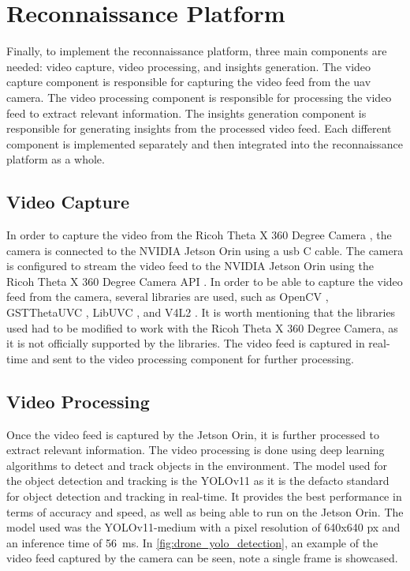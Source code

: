 \section{Reconnaissance Platform}\label{sec:implementation_reconnaissance_platform}

Finally, to implement the reconnaissance platform, three main components are needed: video capture, video processing, and insights generation. The video capture component is responsible for capturing the video feed from the \gls{uav} camera. The video processing component is responsible for processing the video feed to extract relevant information. The insights generation component is responsible for generating insights from the processed video feed. Each different component is implemented separately and then integrated into the reconnaissance platform as a whole.

\subsection{Video Capture}\label{subsec:implementation_video_capture}

In order to capture the video from the Ricoh Theta X 360 Degree Camera \autocite{ricohimagingTHETARicoh}, the camera is connected to the NVIDIA Jetson Orin \autocite{nvidiaNVIDIAJetson} using a \gls{usb} C cable. The camera is configured to stream the video feed to the NVIDIA Jetson Orin using the Ricoh Theta X 360 Degree Camera API \autocite{ricoh360ReferenceRicoh}. In order to be able to capture the video feed from the camera, several libraries are used, such as OpenCV \autocite{githubGitHubOpencvopencv}, GSTThetaUVC \autocite{githubGitHubBuburidergstthetauvc}, LibUVC \autocite{githubGitHub6GIntegration3UC3Mlibuvcthetasample}, and V4L2 \autocite{githubGitHubUmlaeutev4l2loopback}. It is worth mentioning that the libraries used had to be modified to work with the Ricoh Theta X 360 Degree Camera, as it is not officially supported by the libraries. The video feed is captured in real-time and sent to the video processing component for further processing.

\subsection{Video Processing}\label{subsec:implementation_video_processing}

Once the video feed is captured by the Jetson Orin, it is further processed to extract relevant information. The video processing is done using deep learning algorithms to detect and track objects in the environment. The model used for the object detection and tracking is the YOLOv11 \autocite{ultralyticsYOLO11} as it is the defacto standard for object detection and tracking in real-time. It provides the best performance in terms of accuracy and speed, as well as being able to run on the Jetson Orin. The model used was the YOLOv11-medium with a pixel resolution of 640x640 px and an inference time of \SI{56}{\milli\second}. In \cref{fig:drone_yolo_detection}, an example of the video feed captured by the camera can be seen, note a single frame is showcased.

